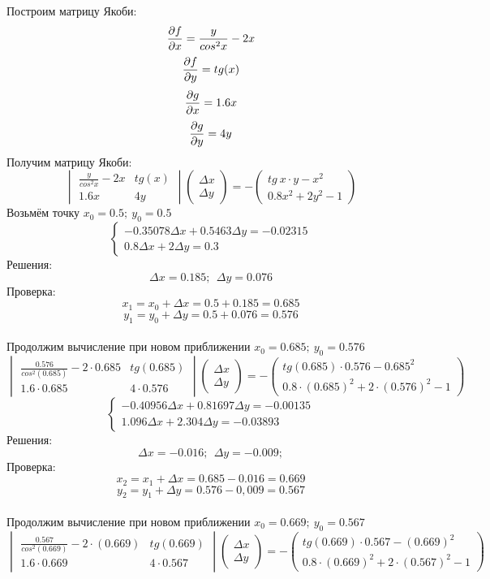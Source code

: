 \documentclass{article}
\begin{document}
Построим матрицу Якоби:
\[\pdv{f}{x} = \frac{y}{cos^2x} - 2x\]
\[\pdv{f}{y} = tg(x)\]
\[\pdv{g}{x} = 1.6x\]
\[\pdv{g}{y} = 4y\]
Получим матрицу Якоби:
\[
    \begin{vmatrix}
        \frac{y}{cos^2x} - 2x & tg(x)\\
        1.6x & 4y 
    \end{vmatrix}
    \begin{pmatrix}
        \Delta x\\
        \Delta y
    \end{pmatrix} = -
    \begin{pmatrix}
        tg\ x\cdot y - x^2\\
        0.8x^2+2y^2 - 1
    \end{pmatrix}
\]
Возьмём точку $x_0 = 0.5; \ y_0 = 0.5$
\[\begin{cases}
    -0.35078\Delta x +0.5463\Delta y = -0.02315\\
    0.8\Delta x + 2\Delta y = 0.3
\end{cases} 
\]
Решения:
\[\Delta x = 0.185; \ \ 
\Delta y = 0.076
\]
Проверка: 
\[x_1 = x_0 + \Delta x = 0.5 + 0.185 = 0.685\]
\[y_1 = y_0 + \Delta y = 0.5 + 0.076 = 0.576\]
\\
Продолжим вычисление при новом приближении $x_0 = 0.685; \ y_0 = 0.576$
\[
    \begin{vmatrix}
        \frac{0.576}{cos^2(0.685)} - 2\cdot 0.685 & tg(0.685)\\
        1.6\cdot 0.685 & 4\cdot0.576 
    \end{vmatrix}
    \begin{pmatrix}
        \Delta x\\
        \Delta y
    \end{pmatrix} = -
    \begin{pmatrix}
        tg(0.685)\cdot 0.576 - 0.685^2\\
        0.8\cdot(0.685)^2+2\cdot(0.576)^2 - 1
    \end{pmatrix}
\]
\[\begin{cases}
    -0.40956\Delta x +0.81697\Delta y = -0.00135\\
    1.096\Delta x + 2.304\Delta y = -0.03893
\end{cases} 
\]
Решения:
\[\Delta x = -0.016; \ \ 
\Delta y = -0.009;
\]
Проверка: 
\[x_2 = x_1 + \Delta x = 0.685 - 0.016 = 0.669\]
\[y_2 = y_1 + \Delta y = 0.576 - 0,009 = 0.567\]
\\
Продолжим вычисление при новом приближении $x_0 = 0.669; \ y_0 = 0.567$
\[
    \begin{vmatrix}
        \frac{0.567}{cos^2(0.669)} - 2\cdot(0.669) & tg(0.669)\\
        1.6\cdot 0.669 & 4\cdot0.567 
    \end{vmatrix}
    \begin{pmatrix}
        \Delta x\\
        \Delta y
    \end{pmatrix} = -
    \begin{pmatrix}
        tg(0.669)\cdot 0.567 - (0.669)^2\\
        0.8\cdot(0.669)^2+2\cdot(0.567)^2 - 1
    \end{pmatrix}
\]
\end{document}
